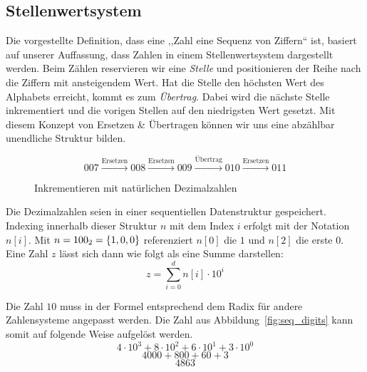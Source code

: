\subsection{Stellenwertsystem}
%
Die vorgestellte Definition, dass eine ,,Zahl eine Sequenz von Ziffern`` ist,
basiert auf unserer Auffassung, dass Zahlen in einem Stellenwertsystem
dargestellt werden. Beim Zählen reservieren wir eine \emph{Stelle} und
positionieren der Reihe nach die Ziffern mit ansteigendem Wert.
Hat die Stelle den höchsten Wert des Alphabets erreicht,
kommt es zum \emph{Übertrag}. Dabei wird die nächste Stelle inkrementiert
und die vorigen Stellen auf den niedrigsten Wert gesetzt.
Mit diesem Konzept von Ersetzen \& Übertragen
können wir uns eine abzählbar unendliche Struktur bilden.
%
\begin{figure}[ht]
  \begin{displaymath}
    007 \xrightarrow{\text{Ersetzen}} 008 \xrightarrow{\text{Ersetzen}}
    009 \xrightarrow{\text{Übertrag}} 010 \xrightarrow{\text{Ersetzen}}
    011
  \end{displaymath}

  \caption{Inkrementieren mit natürlichen Dezimalzahlen}
\end{figure}

Die Dezimalzahlen seien in einer sequentiellen Datenstruktur gespeichert.
Indexing innerhalb dieser Struktur $n$ mit dem Index $i$ erfolgt mit der Notation
$n[i]$. Mit $n = 100_2 = \left\{1, 0, 0\right\}$ referenziert $n[0]$ die $1$ und
$n[2]$ die erste $0$. Eine Zahl $z$ lässt sich dann wie folgt als eine Summe
darstellen:
\[
  z = \sum_{i=0}^d n[i] \cdot 10^i
\]

Die Zahl $10$ muss in der Formel entsprechend dem Radix für andere
Zahlensysteme angepasst werden. Die Zahl aus Abbildung~\ref{fig:seq_digits}
kann somit auf folgende Weise aufgelöst werden.
\[
  4\cdot10^3 + 8\cdot10^2 + 6\cdot10^1 + 3\cdot10^0
\] \[
  4000 + 800 + 60 + 3
\] \[
  4863
\]

